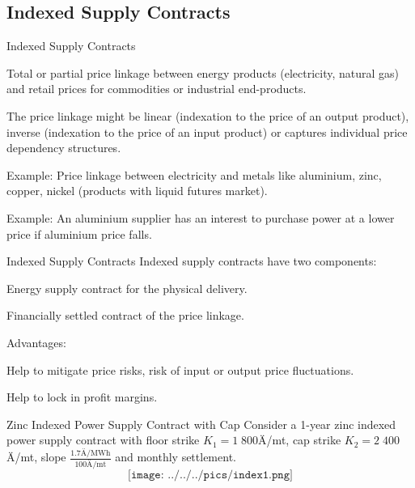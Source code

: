 \subsection{Indexed Supply Contracts}

{Indexed Supply Contracts}






	Total or partial price linkage between energy products (electricity, natural gas) and retail prices for commodities or industrial end-products.

	The price linkage might be linear (indexation to the price of an output product), inverse (indexation to the price of an input product) or captures individual price dependency structures.

	Example: Price linkage between electricity and metals like aluminium, zinc, copper, nickel (products with liquid futures market).

	Example: An aluminium supplier has an interest to purchase power at a lower price if aluminium price falls.






{Indexed Supply Contracts}
Indexed supply contracts have two components:






	Energy supply contract for the physical delivery.

	Financially settled contract of the price linkage.






\vspace{0.5cm}
Advantages:






	Help to mitigate price risks, risk of input or output price fluctuations.

	Help to lock in profit margins.






{Zinc Indexed Power Supply Contract with Cap}
Consider a 1-year zinc indexed power supply contract with floor strike $K_1=1\;800$Ä/mt, cap strike $K_2=2\;400$Ä/mt, slope $\frac{1.7\text{Ä/MWh}}{100\text{Ä/mt}}$ and monthly settlement.
$$\texttt{[image: ../../../pics/index1.png]}$$

